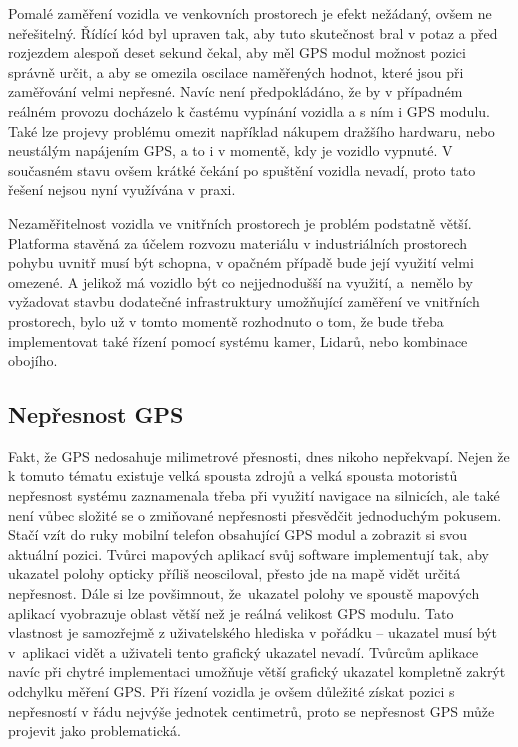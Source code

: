 \documentclass[czech, bachelor]{diploma}
\begin{document}
Pomalé zaměření vozidla ve venkovních prostorech je efekt nežádaný, ovšem ne neřešitelný. Řídící kód byl upraven tak, aby tuto
skutečnost bral v potaz a před rozjezdem alespoň deset sekund čekal, aby měl GPS modul možnost pozici správně určit, a aby se
omezila oscilace naměřených hodnot, které jsou při zaměřování velmi nepřesné. Navíc není předpokládáno, že by v případném reálném
provozu docházelo k častému vypínání vozidla a s ním i GPS modulu. Také lze projevy problému omezit například nákupem dražšího
hardwaru, nebo neustálým napájením GPS, a to i v momentě, kdy je vozidlo vypnuté. V současném stavu ovšem krátké čekání
po spuštění vozidla nevadí, proto tato řešení nejsou nyní využívána v praxi.

Nezaměřitelnost vozidla ve vnitřních prostorech je problém podstatně větší. Platforma stavěná za účelem rozvozu materiálu
v industriálních prostorech pohybu uvnitř musí být schopna, v opačném případě bude její využití velmi omezené. A jelikož má
vozidlo být co nejjednodušší na využití, a~nemělo by vyžadovat stavbu dodatečné infrastruktury umožňující zaměření ve vnitřních
prostorech, bylo už v tomto momentě rozhodnuto o tom, že bude třeba implementovat také řízení pomocí systému kamer, Lidarů, nebo
kombinace obojího.

\subsection{Nepřesnost GPS} \label{gps-inaccuracy}

Fakt, že GPS nedosahuje milimetrové přesnosti, dnes nikoho nepřekvapí. Nejen že k tomuto tématu existuje velká spousta zdrojů
\cite{gps-inaccuracy-source} a velká spousta motoristů nepřesnost systému zaznamenala třeba při využití navigace na silnicích,
ale také není vůbec složité se o zmiňované nepřesnosti přesvědčit jednoduchým pokusem. Stačí vzít do ruky mobilní telefon
obsahující GPS modul a zobrazit si svou aktuální pozici. Tvůrci mapových aplikací svůj software implementují tak, aby ukazatel
polohy opticky příliš neosciloval, přesto jde na mapě vidět určitá nepřesnost. Dále si lze povšimnout, že~ukazatel polohy
ve spoustě mapových aplikací vyobrazuje oblast větší než je reálná velikost GPS modulu. Tato vlastnost je samozřejmě
z uživatelského hlediska v pořádku -- ukazatel musí být v~aplikaci vidět a uživateli tento grafický ukazatel nevadí. Tvůrcům
aplikace navíc při chytré implementaci umožňuje větší grafický ukazatel kompletně zakrýt odchylku měření GPS. Při řízení vozidla
je ovšem důležité získat pozici s nepřesností v řádu nejvýše jednotek centimetrů, proto se nepřesnost GPS může projevit jako
problematická.
\end{document}
